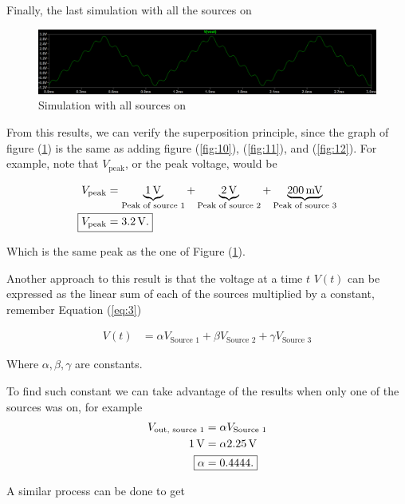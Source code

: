 \documentclass[english,12pt]{article}
\begin{document}
Finally, the last simulation with all the sources on

\begin{figure}[h]
    \centering
    \includegraphics[scale=0.25]{exp1-all.png}
    \caption{Simulation with all sources on}
    \label{fig:13}
\end{figure}

From this results, we can verify the superposition principle, since the graph of figure (\ref{fig:13}) is the same as adding figure (\ref{fig:10}), (\ref{fig:11}), and (\ref{fig:12}). For example, note that $V_{\text{peak}}$, or the peak voltage, would be

\begin{align*}
    V_{\text{peak}} &= \underbrace{\SI{1}{\volt}}_{\text{Peak of source 1}} + \underbrace{\SI{2}{\volt}}_{\text{Peak of source 2}}+ \underbrace{\SI{200}{\milli\volt}}_{\text{Peak of source 3}}\\
    \Aboxed{V_{\text{peak}} &= \SI{3.2}{\volt}.}
\end{align*}

Which is the same peak as the one of Figure (\ref{fig:13}).

Another approach to this result is that the voltage at a time $t$ $V(t)$ can be expressed as the linear sum of each of the sources multiplied by a constant, remember Equation (\ref{eq:3})

\begin{align*}
    V(t) &= \alpha V_\text{Source 1} + \beta V_\text{Source 2} + \gamma V_\text{Source 3}
\end{align*}

Where $\alpha,\beta,\gamma$ are constants.

To find such constant we can take advantage of the results when only one of the sources was on, for example
 \begin{align*}
    V_\text{out, source 1} &= \alpha V_\text{Source 1}\\
     \SI{1}{\volt} &= \alpha \SI{2.25}{\volt}\\
     \Aboxed{\alpha &= 0.4444.}
 \end{align*}

 A similar process can be done to get
\end{document}
